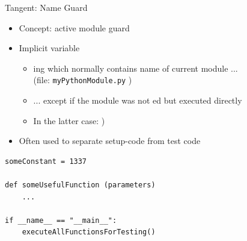 \begin{frame}[fragile]{Tangent: Name Guard}
%
\begin{itemize}
\item Concept: active module guard
\item Implicit variable 
	\begin{itemize}
	\item {}ing which normally contains name of current module ... \\
		\quad (file: \texttt{myPythonModule.py} \thus {})
	\item ... except if the module was not ed but executed directly
	\item In the latter case: )
	\end{itemize}
\item Often used to separate setup-code from test code
\end{itemize}
%
\begin{codebox}
\begin{verbatim}
someConstant = 1337

def someUsefulFunction (parameters)
    ...

if __name__ == "__main__":
    executeAllFunctionsForTesting()
\end{verbatim}
\end{codebox}
%
\end{frame}


